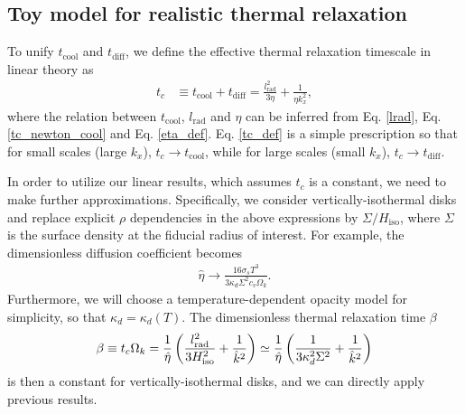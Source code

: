\subsection{Toy model for realistic thermal relaxation}\label{toy_relax}
To unify $t_\mathrm{cool}$ and $t_\mathrm{diff}$, we define the
effective thermal relaxation timescale in linear theory as
\begin{align}\label{tc_def}
  t_c &\equiv t_\mathrm{cool} + t _\mathrm{diff} =
  \frac{l_\mathrm{rad}^2}{3\eta} + \frac{1}{\eta k_x^2},  
\end{align}
where the relation between $t_\mathrm{cool}$, $l_\mathrm{rad}$ and
$\eta$ can be inferred from Eq. \ref{lrad}, Eq. \ref{tc_newton_cool}
and Eq. \ref{eta_def}. Eq. \ref{tc_def} is a simple prescription so
that for small scales (large $k_x$), $t_c\to t_\mathrm{cool}$, while
for large scales (small $k_x$), $t_c\to t_\mathrm{diff}$. 

In order to utilize our linear results, which assumes $t_c$ is a
constant, we need to make further 
approximations. Specifically, we consider vertically-isothermal disks
and replace explicit $\rho$ dependencies in the above expressions by $\Sigma/
H_\mathrm{iso}$, where $\Sigma$ is the surface density at the fiducial
radius of interest. For example, the dimensionless diffusion
coefficient becomes 
\begin{align}\label{diff_coeff_dimensionless}
  \hat{\eta} \to  \frac{16\sigma_s T^3}{3\kappa_d\Sigma^2
    c_v\Omega_k}. 
\end{align}
Furthermore, we will choose a temperature-dependent opacity model for
simplicity, so that $\kappa_d=\kappa_d(T)$. The dimensionless thermal
relaxation time $\beta$  
\begin{align}\label{real_beta}
  \beta \equiv t_c\Omega_k =
  \frac{1}{\hat{\eta}}\left(\frac{l_\mathrm{rad}^2}{3H_\mathrm{iso}^2}
    + \frac{1}{\hat{k}^2}\right)  \simeq
  \frac{1}{\hat{\eta}}\left(\frac{1}{3\kappa_d^2\Sigma^2} 
    + \frac{1}{\hat{k}^2}\right)
\end{align}
is then a constant for vertically-isothermal disks, 
and we can directly apply previous results. 

